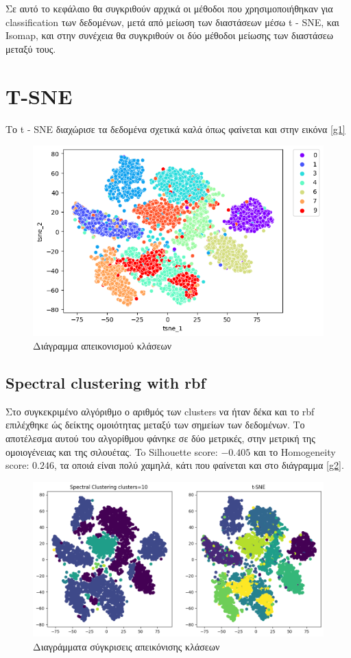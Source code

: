 Σε αυτό το κεφάλαιο θα συγκριθούν αρχικά οι μέθοδοι που χρησιμοποιήθηκαν για classification των δεδομένων, μετά από μείωση των διαστάσεων μέσω t - SNE, και Isomap, και στην συνέχεια
θα συγκριθούν οι δύο μέθοδοι μείωσης των διαστάσεω μεταξύ τους.
\section{T-SNE}
Το t - SNE διαχώρισε τα δεδομένα σχετικά καλά όπως φαίνεται και στην εικόνα \ref{g1}
\begin{figure}[ht]
	\centering
	\includegraphics[width=1\linewidth]{Imagedata1/tsne.png}
	\caption{ Διάγραμμα απεικονισμού κλάσεων }
	\label{f:g1}	
\end{figure}

\clearpage

\subsection{Spectral clustering with rbf}

Στο συγκεκριμένο αλγόριθμο ο αριθμός των clusters να ήταν δέκα και το rbf επιλέχθηκε ώς δείκτης ομοιότητας μεταξύ των σημείων των δεδομένων.
Το αποτέλεσμα αυτού του αλγορίθμου φάνηκε σε δύο μετρικές, στην μετρική της ομοιογένειας και της σιλουέτας. To Silhouette score: $-0.405$ και το Homogeneity score: $0.246$, τα οποιά είναι πολύ χαμηλά, κάτι που φαίνεται και στο διάγραμμα \ref{g2}.

\begin{figure}[ht]
	\centering
	\includegraphics[width=1\linewidth]{Imagedata1/rbftsne.png}
	\caption{ Διαγράμματα σύγκρισεις απεικόνισης κλάσεων }
	\label{f:g2}	
\end{figure}

